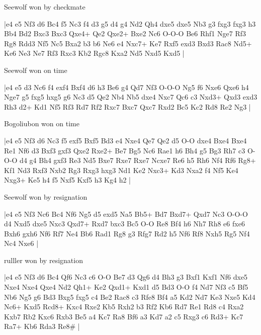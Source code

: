 \showboard

Seewolf won by checkmate

\makegametitle
|e4 e5 Nf3 d6 Bc4 f5 Nc3 f4 d3 g5 d4 g4 Nd2 Qh4 dxe5 dxe5 Nb3 g3 fxg3 fxg3 h3 Bb4 Bd2 Bxc3 Bxc3 Qxe4+ Qe2 Qxe2+ Bxe2 Nc6 O-O-O Be6 Rhf1 Nge7 Rf3 Rg8 Rdd3 Nf5 Nc5 Bxa2 b3 b6 Ne6 e4 Nxc7+ Ke7 Rxf5 exd3 Bxd3 Rac8 Nd5+ Ke6 Ne3 Ne7 Rf3 Rxc3 Kb2 Rgc8 Kxa2 Nd5 Nxd5 Kxd5  |

\showboard

Seewolf won on time

\makegametitle
|e4 e5 d3 Nc6 f4 exf4 Bxf4 d6 h3 Be6 g4 Qd7 Nf3 O-O-O Ng5 f6 Nxe6 Qxe6 h4 Nge7 g5 fxg5 hxg5 g6 Nc3 d5 Qe2 Nb4 Nb5 dxe4 Nxc7 Qc6 c3 Nxd3+ Qxd3 exd3 Rh3 d2+ Kd1 Nf5 Rf3 Rd7 Rf2 Rxc7 Bxc7 Qxc7 Rxd2 Bc5 Kc2 Rd8 Re2 Ng3  |

\showboard

Bogoliubon won on time

\makegametitle
|e4 e5 Nf3 d6 Nc3 f5 exf5 Bxf5 Bd3 e4 Nxe4 Qe7 Qe2 d5 O-O dxe4 Bxe4 Bxe4 Re1 Nf6 d3 Bxf3 gxf3 Qxe2 Rxe2+ Be7 Bg5 Nc6 Rae1 h6 Bh4 g5 Bg3 Rh7 c3 O-O-O d4 g4 Bh4 gxf3 Re3 Nd5 Bxe7 Rxe7 Rxe7 Ncxe7 Re6 h5 Rh6 Nf4 Rf6 Rg8+ Kf1 Nd3 Rxf3 Nxb2 Rg3 Rxg3 hxg3 Nd1 Ke2 Nxc3+ Kd3 Nxa2 f4 Nf5 Ke4 Nxg3+ Ke5 h4 f5 Nxf5 Kxf5 h3 Kg4 h2  |

\showboard

Seewolf won by resignation

\makegametitle
|e4 e5 Nf3 Nc6 Bc4 Nf6 Ng5 d5 exd5 Na5 Bb5+ Bd7 Bxd7+ Qxd7 Nc3 O-O-O d4 Nxd5 dxe5 Nxc3 Qxd7+ Rxd7 bxc3 Bc5 O-O Re8 Bf4 h6 Nh7 Rh8 e6 fxe6 Bxh6 gxh6 Nf6 Rf7 Ne4 Bb6 Rad1 Rg8 g3 Rfg7 Rd2 h5 Nf6 Rf8 Nxh5 Rg5 Nf4 Nc4 Nxe6  |

\showboard

rulller won by resignation

\makegametitle
|e4 e5 Nf3 d6 Bc4 Qf6 Nc3 c6 O-O Be7 d3 Qg6 d4 Bh3 g3 Bxf1 Kxf1 Nf6 dxe5 Nxe4 Nxe4 Qxe4 Nd2 Qh1+ Ke2 Qxd1+ Kxd1 d5 Bd3 O-O f4 Nd7 Nf3 c5 Bf5 Nb6 Ng5 g6 Bd3 Bxg5 fxg5 c4 Be2 Rac8 c3 Rfe8 Bf4 a5 Kd2 Nd7 Ke3 Nxe5 Kd4 Nc6+ Kxd5 Rcd8+ Kxc4 Rxe2 Kb5 Rxh2 b3 Rf2 Kb6 Rd7 Re1 Rd8 c4 Rxa2 Kxb7 Rb2 Kxc6 Rxb3 Be5 a4 Kc7 Ra8 Bf6 a3 Kd7 a2 c5 Rxg3 c6 Rd3+ Kc7 Ra7+ Kb6 Rda3 Re8\#  |

